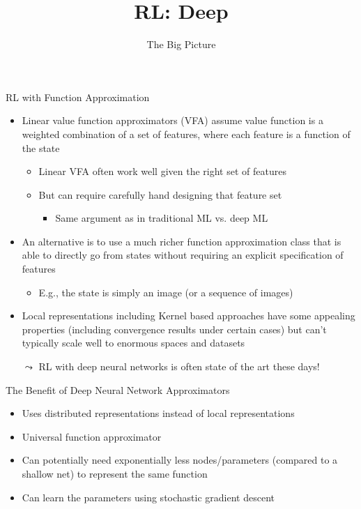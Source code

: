 \documentclass[aspectratio=169]{../latex_main/tntbeamer}  %
\title[RL: Deep Reinforcement Learning]{RL: Deep}
\subtitle{The Big Picture}
\begin{document}
	
	\maketitle

\begin{frame}[c]{RL with Function Approximation}
	
	\begin{itemize}
		\item Linear value function approximators (VFA) assume value function is a weighted combination of a set of features, where each feature is a function of the state
		\begin{itemize}
		\item Linear VFA often work well given the \alert{right set of features}
		\item But can require carefully hand designing that feature set
		\begin{itemize}
			\item Same argument as in traditional ML vs. deep ML
		\end{itemize}
		\end{itemize}
        \pause
		\item An alternative is to use a much richer function approximation class that is able to directly go from states without requiring an explicit specification of features
		\begin{itemize}
			\item E.g., the state is simply an image (or a sequence of images)
		\end{itemize}
        \pause
		\item Local representations including Kernel based approaches have some	appealing properties (including convergence results under certain	cases) but can’t typically scale well to enormous spaces and datasets
		\item[$\leadsto$] RL with deep neural networks is often state of the art these days!
	\end{itemize}

\end{frame}
\begin{frame}[c]{The Benefit of Deep Neural Network Approximators}
	
	\begin{itemize}
		\item Uses distributed representations instead of local representations
		\item Universal function approximator
		\item Can potentially need exponentially less nodes/parameters (compared to
		a shallow net) to represent the same function
		\item Can learn the parameters using stochastic gradient descent
	\end{itemize}

\end{frame}
\end{document}
